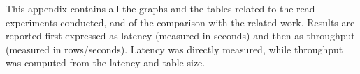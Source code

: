 This appendix contains all the graphs and the tables related to the read experiments conducted, and of the comparison with the related work. Results are reported first expressed as latency (measured in seconds) and then as throughput (measured in rows/seconds). Latency was directly measured, while throughput was computed from the latency and table size.